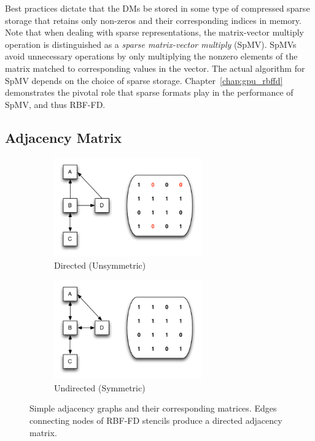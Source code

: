 \documentclass[11pt]{report}
\begin{document}
{Best practices dictate that the DMs be stored in some type of compressed sparse storage that retains only non-zeros and their corresponding indices in memory. Note that when dealing with sparse representations, the matrix-vector multiply operation is distinguished as a \emph{sparse matrix-vector multiply} (SpMV). SpMVs avoid unnecessary operations by only multiplying the nonzero elements of the matrix matched to corresponding values in the vector. The actual algorithm for SpMV depends on the choice of sparse storage. Chapter~\ref{chap:gpu_rbffd} demonstrates the pivotal role that sparse formats play in the performance of SpMV, and thus RBF-FD. 

\subsection{Adjacency Matrix}
\label{subsec:adjacency}
\begin{figure}[ht!]
\begin{center}
\begin{subfigure}[b]{0.425\textwidth}
\includegraphics[width=2.5in]{../figures/omnigraffle/DirectedAdjacencyGraph.png}
\caption{Directed (Unsymmetric)}
\label{fig:directed_graph}
\end{subfigure}
\begin{subfigure}[b]{0.425\textwidth}
\includegraphics[width=2.5in]{../figures/omnigraffle/UndirectedAdjacencyGraph.png}
\caption{Undirected (Symmetric)}
\label{fig:undirected_graph}
\end{subfigure}
\caption{Simple adjacency graphs and their corresponding matrices. Edges connecting nodes of RBF-FD stencils produce a directed adjacency matrix.}
\label{fig:adjacency_matrix}
\end{center}
\end{figure}

}
\end{document}
